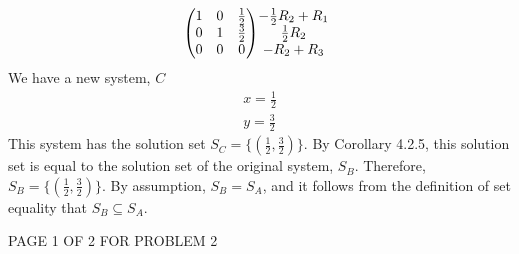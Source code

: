 \documentclass[12pt]{article}
\newenvironment{problem}[2][Problem]
{
	\begin{trivlist} 
		\item[\hskip \labelsep {\bfseries #1 #2:}]
	}
{
	\end{trivlist}
	}
\newenvironment{solution}[1][Solution]
{
	\begin{trivlist} 
		\item[\hskip \labelsep {\itshape #1:}]
	}
	{
	\end{trivlist}
}
\begin{document}
\begin{problem}{2}
\begin{solution}
\begin{align*}
\begin{pmatrix} 1&0&\frac{1}{2}\\0&1&\frac{3}{2}\\0&0&0 \end{pmatrix}
&\begin{matrix} -\frac{1}{2} R_2 +R_1 \hphantom{1}\\ \frac{1}{2} R_2 \hphantom{1}\\ -R_2+R_3 \hphantom{1}\end{matrix}\\
\end{align*}
We have a new system, $C$
\begin{align*}
x=\frac{1}{2}\\
y=\frac{3}{2}
\end{align*}
This system has the solution set $S_C = \{(\frac{1}{2},\frac{3}{2})\}$. By Corollary 4.2.5, this solution set is equal to the solution set of the original system, $S_B$. Therefore, $S_B =  \{(\frac{1}{2},\frac{3}{2})\}$. By assumption, $S_B = S_A$, and it follows from the definition of set equality that $S_B \subseteq S_A$.
\end{solution}
\vfill
\centerline{PAGE 1 OF 2 FOR PROBLEM 2}
\end{problem}
\end{document}
